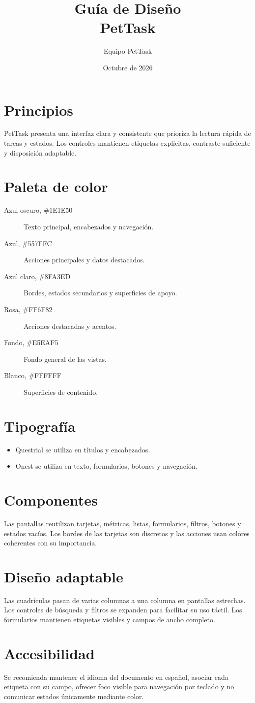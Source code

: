 \documentclass[12pt]{article}
\title{Guía de Diseño\\PetTask}
\author{Equipo PetTask}
\date{Octubre de 2026}
\begin{document}
\maketitle
\section{Principios}
PetTask presenta una interfaz clara y consistente que prioriza la lectura rápida de tareas y estados. Los controles mantienen etiquetas explícitas, contraste suficiente y disposición adaptable.
\section{Paleta de color}
\begin{description}
    \item[Azul oscuro, \#1E1E50] Texto principal, encabezados y navegación.
    \item[Azul, \#557FFC] Acciones principales y datos destacados.
    \item[Azul claro, \#8FA3ED] Bordes, estados secundarios y superficies de apoyo.
    \item[Rosa, \#FF6F82] Acciones destacadas y acentos.
    \item[Fondo, \#E5EAF5] Fondo general de las vistas.
    \item[Blanco, \#FFFFFF] Superficies de contenido.
\end{description}
\section{Tipografía}
\begin{itemize}
    \item Questrial se utiliza en títulos y encabezados.
    \item Onest se utiliza en texto, formularios, botones y navegación.
\end{itemize}
\section{Componentes}
Las pantallas reutilizan tarjetas, métricas, listas, formularios, filtros, botones y estados vacíos. Los bordes de las tarjetas son discretos y las acciones usan colores coherentes con su importancia.
\section{Diseño adaptable}
Las cuadrículas pasan de varias columnas a una columna en pantallas estrechas. Los controles de búsqueda y filtros se expanden para facilitar su uso táctil. Los formularios mantienen etiquetas visibles y campos de ancho completo.
\section{Accesibilidad}
Se recomienda mantener el idioma del documento en español, asociar cada etiqueta con su campo, ofrecer foco visible para navegación por teclado y no comunicar estados únicamente mediante color.
\end{document}
